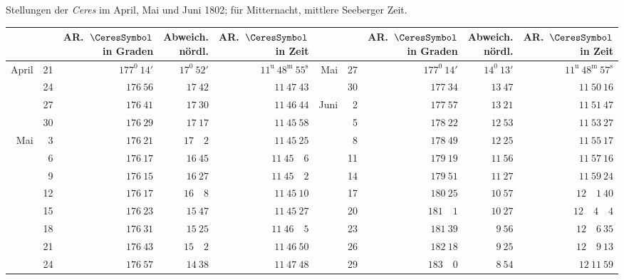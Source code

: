 \begin{center}
Stellungen der \textit{Ceres} im April, Mai und Juni 1802; für Mitternacht, mittlere Seeberger Zeit.\par\medskip
{\fontsize{9}{11}\selectfont\setlength{\tabcolsep}{2pt}
\begin{tabular}{@{}rr|r|r|r||rr|r|r|r@{}}
\multicolumn{2}{c|}{}&\shortstack{AR.\ $\CeresSymbol$\\in Graden}&\shortstack{Abweich.\\nördl.}&\shortstack{AR.\ $\CeresSymbol$\\in Zeit}&\multicolumn{2}{c|}{}&\shortstack{AR.\ $\CeresSymbol$\\in Graden}&\shortstack{Abweich.\\nördl.}&\shortstack{AR.\ $\CeresSymbol$\\in Zeit}\\\hline
April&21&$177^0\ 14'$&$17^0\ 52'$&$11^{\mathrm u}\ 48^{\mathrm m}\ 55^{\mathrm s}$&Mai&27&$177^0\ 14'$&$14^0\ 13'$&$11^{\mathrm u}\ 48^{\mathrm m}\ 57^{\mathrm s}$\\
&24&$176\ 56$&$17\ 42$&$11\ 47\ 43$&&30&$177\ 34$&$13\ 47$&$11\ 50\ 16$\\
&27&$176\ 41$&$17\ 30$&$11\ 46\ 44$&Juni&2&$177\ 57$&$13\ 21$&$11\ 51\ 47$\\
&30&$176\ 29$&$17\ 17$&$11\ 45\ 58$&&5&$178\ 22$&$12\ 53$&$11\ 53\ 27$\\
Mai&3&$176\ 21$&$17\quad2$&$11\ 45\ 25$&&8&$178\ 49$&$12\ 25$&$11\ 55\ 17$\\
&6&$176\ 17$&$16\ 45$&$11\ 45\quad6$&&11&$179\ 19$&$11\ 56$&$11\ 57\ 16$\\
&9&$176\ 15$&$16\ 27$&$11\ 45\quad2$&&14&$179\ 51$&$11\ 27$&$11\ 59\ 24$\\
&12&$176\ 17$&$16\quad8$&$11\ 45\ 10$&&17&$180\ 25$&$10\ 57$&$12\quad1\ 40$\\
&15&$176\ 23$&$15\ 47$&$11\ 45\ 27$&&20&$181\quad1$&$10\ 27$&$12\quad4\quad4$\\
&18&$176\ 31$&$15\ 25$&$11\ 46\quad5$&&23&$181\ 39$&$9\ 56$&$12\quad6\ 35$\\
&21&$176\ 43$&$15\quad2$&$11\ 46\ 50$&&26&$182\ 18$&$9\ 25$&$12\quad9\ 13$\\
&24&$176\ 57$&$14\ 38$&$11\ 47\ 48$&&29&$183\quad0$&$8\ 54$&$12\ 11\ 59$
\end{tabular}}
\end{center}


